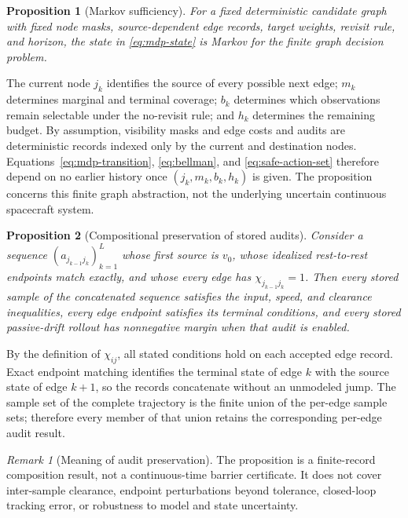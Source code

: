 \documentclass{IEEEtaes}
\newtheorem{proposition}{Proposition}
\theoremstyle{remark}
\newtheorem{remark}{Remark}
\theoremstyle{plain}
\begin{document}
\begin{proposition}[Markov sufficiency]
\label{prop:markov-sufficiency}
For a fixed deterministic candidate graph with fixed node masks, source-dependent edge records, target weights, revisit rule, and horizon, the state in \eqref{eq:mdp-state} is Markov for the finite graph decision problem.
\end{proposition}

\begin{IEEEproof}
The current node $j_k$ identifies the source of every possible next edge; $m_k$ determines marginal and terminal coverage; $b_k$ determines which observations remain selectable under the no-revisit rule; and $h_k$ determines the remaining budget. By assumption, visibility masks and edge costs and audits are deterministic records indexed only by the current and destination nodes. Equations~\eqref{eq:mdp-transition}, \eqref{eq:bellman}, and \eqref{eq:safe-action-set} therefore depend on no earlier history once $(j_k,m_k,b_k,h_k)$ is given. The proposition concerns this finite graph abstraction, not the underlying uncertain continuous spacecraft system.
\end{IEEEproof}

\begin{proposition}[Compositional preservation of stored audits]
\label{prop:audit-composition}
Consider a sequence $(a_{j_{k-1}j_k})_{k=1}^{L}$ whose first source is $v_0$, whose idealized rest-to-rest endpoints match exactly, and whose every edge has $\chi_{j_{k-1}j_k}=1$. Then every stored sample of the concatenated sequence satisfies the input, speed, and clearance inequalities, every edge endpoint satisfies its terminal conditions, and every stored passive-drift rollout has nonnegative margin when that audit is enabled.
\end{proposition}

\begin{IEEEproof}
By the definition of $\chi_{ij}$, all stated conditions hold on each accepted edge record. Exact endpoint matching identifies the terminal state of edge $k$ with the source state of edge $k+1$, so the records concatenate without an unmodeled jump. The sample set of the complete trajectory is the finite union of the per-edge sample sets; therefore every member of that union retains the corresponding per-edge audit result.
\end{IEEEproof}

\begin{remark}[Meaning of audit preservation]
The proposition is a finite-record composition result, not a continuous-time barrier certificate. It does not cover inter-sample clearance, endpoint perturbations beyond tolerance, closed-loop tracking error, or robustness to model and state uncertainty.
\end{remark}
\end{document}
